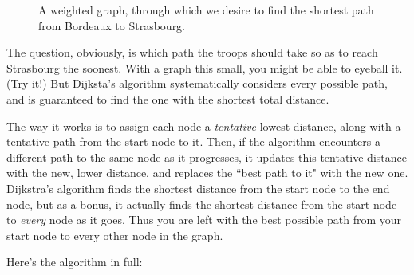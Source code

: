 \begin{figure}[ht]
\centering
\caption{A weighted graph, through which we desire to find the shortest
path from Bordeaux to Strasbourg.}
\label{france}
\end{figure}

The question, obviously, is which path the troops should take so as to
reach Strasbourg the soonest. With a graph this small, you might be able to
eyeball it. (Try it!) But Dijksta's algorithm systematically considers
every possible path, and is guaranteed to find the one with the shortest
total distance.

The way it works is to assign each node a \textit{tentative} lowest
distance, along with a tentative path from the start node to it. Then, if
the algorithm encounters a different path to the same node as it
progresses, it updates this tentative distance with the new, lower
distance, and replaces the ``best path to it" with the new one. Dijkstra's
algorithm finds the shortest distance from the start node to the end node,
but as a bonus, it actually finds the shortest distance from the start node
to \textit{every} node as it goes. Thus you are left with the best possible
path from your start node to every other node in the graph.

Here's the algorithm in full:

